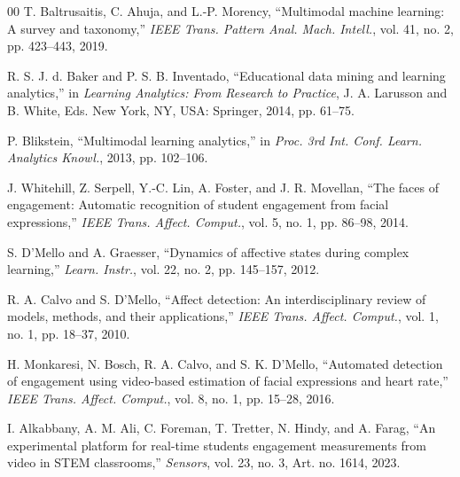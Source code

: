 \documentclass[conference]{IEEEtran}
\begin{document}
\begin{thebibliography}{00}
 T. Baltrusaitis, C. Ahuja, and L.-P. Morency, ``Multimodal machine learning: A survey and taxonomy,'' \textit{IEEE Trans. Pattern Anal. Mach. Intell.}, vol. 41, no. 2, pp. 423--443, 2019.

 R. S. J. d. Baker and P. S. B. Inventado, ``Educational data mining and learning analytics,'' in \textit{Learning Analytics: From Research to Practice}, J. A. Larusson and B. White, Eds. New York, NY, USA: Springer, 2014, pp. 61--75.

 P. Blikstein, ``Multimodal learning analytics,'' in \textit{Proc. 3rd Int. Conf. Learn. Analytics Knowl.}, 2013, pp. 102--106.

 J. Whitehill, Z. Serpell, Y.-C. Lin, A. Foster, and J. R. Movellan, ``The faces of engagement: Automatic recognition of student engagement from facial expressions,'' \textit{IEEE Trans. Affect. Comput.}, vol. 5, no. 1, pp. 86--98, 2014.

 S. D'Mello and A. Graesser, ``Dynamics of affective states during complex learning,'' \textit{Learn. Instr.}, vol. 22, no. 2, pp. 145--157, 2012.

 R. A. Calvo and S. D'Mello, ``Affect detection: An interdisciplinary review of models, methods, and their applications,'' \textit{IEEE Trans. Affect. Comput.}, vol. 1, no. 1, pp. 18--37, 2010.

 H. Monkaresi, N. Bosch, R. A. Calvo, and S. K. D'Mello, ``Automated detection of engagement using video-based estimation of facial expressions and heart rate,'' \textit{IEEE Trans. Affect. Comput.}, vol. 8, no. 1, pp. 15--28, 2016.

 I. Alkabbany, A. M. Ali, C. Foreman, T. Tretter, N. Hindy, and A. Farag, ``An experimental platform for real-time students engagement measurements from video in STEM classrooms,'' \textit{Sensors}, vol. 23, no. 3, Art. no. 1614, 2023.
\end{thebibliography}
\end{document}
